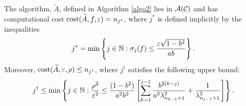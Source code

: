 \documentclass[graybox,footinfo]{svmult}
\begin{document}
\begin{theorem}\label{thm:compcost}
The algorithm, $\widetilde{A}$, defined in Algorithm \ref{algo2} lies in ${\mathcal{A}}({\mathcal{C}})$ and has computational cost $\textup{cost}(\widetilde{A},f,\varepsilon)=n_{j^*}$, where $j^*$ is defined implicitly by the inequalities 
\begin{equation} \label{eq:OurAlgjstar}
j^* = \min\left \{ j \in \bbN : \sigma_{j}(f) \le \frac{\varepsilon\sqrt{1 - b^2}}{ab}  \right\}.
\end{equation}
Moreover, $\textup{cost}(\widetilde{A},\varepsilon,\rho) \le n_{j^\dagger}$, where $j^\dagger$ satisfies the following upper bound:
\begin{equation} \label{jdagger}
j^\dagger \le \min \left \{j \in \bbN : \frac{\rho^2}{\varepsilon^2} \le \frac{(1 - b^2)}{a^2b^2} \left[ \sum_{k=1}^{j-1} \frac{b^{2(k-j)}}{a^2\lambda_{n_{k-1}+1}^2} + \frac{1}{\lambda_{n_{j-1}+1}^2}\right]   \right\}.
\end{equation}

\end{theorem}
\end{document}
